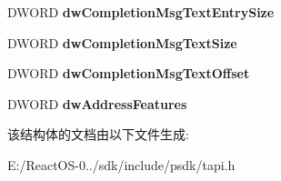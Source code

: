\begin{DoxyCompactItemize}
D\+W\+O\+RD {\bfseries dw\+Completion\+Msg\+Text\+Entry\+Size}
\item 
\mbox{\label{structlineaddresscaps__tag_a7261244af4dc010376cdbf630c52348f}} 
D\+W\+O\+RD {\bfseries dw\+Completion\+Msg\+Text\+Size}
\item 
\mbox{\label{structlineaddresscaps__tag_a99d2215a75e7ab927817f1e3cd1bec80}} 
D\+W\+O\+RD {\bfseries dw\+Completion\+Msg\+Text\+Offset}
\item 
\mbox{\label{structlineaddresscaps__tag_a87d4bc89d680e1a34e692b7cad3cfc18}} 
D\+W\+O\+RD {\bfseries dw\+Address\+Features}
\end{DoxyCompactItemize}


该结构体的文档由以下文件生成\+:\begin{DoxyCompactItemize}
\item 
E\+:/\+React\+O\+S-\/0../sdk/include/psdk/tapi.\+h\end{DoxyCompactItemize}

